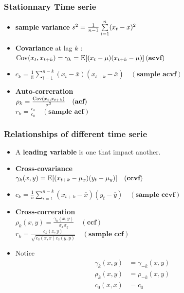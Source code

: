 \documentclass[10pt, french]{article}
\begin{document}
\begin{multicols*}{3}
\subsubsection*{Stationnary Time serie}
\begin{itemize}[align=left,leftmargin=*]
    \item \textbf{sample variance} $s^2 = \frac{1}{n-1} \sum\limits_{i=1}^n (x_t - \bar{x})^2$
    \item \textbf{Covariance} at lag $k$ : \\
    $\mathrm{Cov} {\left( x_t,x_{t+k} \right)} = \gamma_k = \mathrm{E} {\left[ (x_t - \mu)(x_{t+k} - \mu) \right]} \: (\textbf{acvf}) $
    \item[] $c_k = \frac{1}{n} \sum_{i=1}^{n-k} (x_t - \bar{x})(x_{t+k} - \bar{x})\quad (\textbf{sample acvf})$
    \item \textbf{Auto-correration} \\
     $\rho_k = \frac{\mathrm{Cov} {\left( x_t,x_{t+k} \right)}}{\sigma^2}\quad (\textbf{acf})$ \\
    $r_k = \frac{c_k}{c_0}\quad (\textbf{sample acf})$
\end{itemize}
\subsubsection*{Relationships of different time serie}
\begin{itemize}[align=left,leftmargin=*]
   \item A \textbf{leading variable} is one that impact another.   
   \item \textbf{Cross-covariance} \\
    $\gamma_k(x,y) = \mathrm{E} {\left[ (x_{t+k} - \mu_x)(y_t - \mu_y) \right]} \quad (\textbf{ccvf}) $
    \item[] $c_k = \frac{1}{n} \sum\limits_{i=1}^{n-k} (x_{t+k} - \bar{x})(y_t - \bar{y})\quad (\textbf{sample ccvf})$
    \item \textbf{Cross-correration} \\
     $\rho_k(x,y) = \frac{\gamma_k(x,y)}{\sigma_x \sigma_y}\quad (\textbf{ccf}) $ \\
    $r_k = \frac{c_k(x,y)}{\sqrt{c_0(x,x)c_0(y,y)}}\quad (\textbf{sample ccf})$
    \item Notice
    \begin{align*}
      \gamma_k(x,y) &= \gamma_{-k}(x,y) \\
      \rho_k(x,y) &= \rho_{-k}(x,y) \\
       c_0(x,x) &= c_0
    \end{align*}
\end{itemize}


\end{multicols*}
\end{document}
